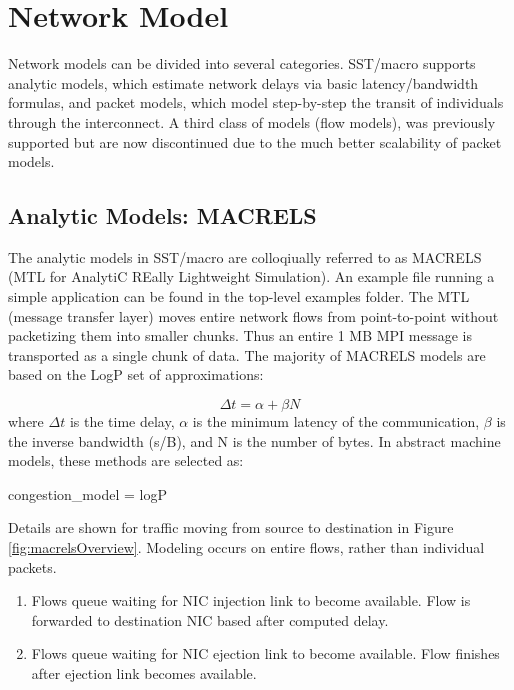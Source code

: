 
\section{Network Model}
\label{sec:tutorial:networkmodel}

Network models can be divided into several categories.  SST/macro supports analytic models, which estimate network delays via basic latency/bandwidth formulas, and packet models, which model step-by-step the transit of individuals through the interconnect.
A third class of models (flow models), was previously supported but are now discontinued due to the much better scalability of packet models.

\subsection{Analytic Models: MACRELS}
\label{subsec:tutorial:macrels}

The analytic models in SST/macro are colloqiually referred to as MACRELS (MTL for AnalytiC REally Lightweight Simulation).
An example file running a simple application can be found in the top-level examples folder.
The MTL (message transfer layer) moves entire network flows from point-to-point without packetizing them into smaller chunks.
Thus an entire 1 MB MPI message is transported as a single chunk of data.
The majority of MACRELS models are based on the LogP set of approximations:

\[
\Delta t = \alpha + \beta N
\]
where $\Delta t$ is the time delay, $\alpha$ is the minimum latency of the communication, $\beta$ is the inverse bandwidth (s/B), and N is the number of bytes.
In abstract machine models, these methods are selected as:

\begin{ViFile}
congestion_model = logP
\end{ViFile}
Details are shown for traffic moving from source to destination in Figure \ref{fig:macrelsOverview}.
Modeling occurs on entire flows, rather than individual packets. 

\begin{enumerate}
\item Flows queue waiting for NIC injection link to become available. Flow is forwarded to destination NIC based after computed delay. 
\item Flows queue waiting for NIC ejection link to become available. Flow finishes after ejection link becomes available.
\end{enumerate}

